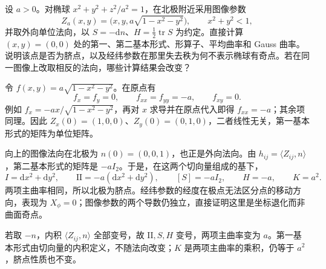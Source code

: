 \begin{exercise}\label{g1:ex:ellipsoid-polar-graph}
	设 \(a>0\)。对椭球 \(x^2+y^2+z^2/a^2=1\)，在北极附近采用图像参数
	\[
		Z_a(x,y)=\bigl(x,y,a\sqrt{1-x^2-y^2}\bigr),\qquad x^2+y^2<1,
	\]
	并取外向单位法向，以 \(S=-\mathrm{d}n\)、\(H=\tfrac12\operatorname{tr}S\) 为约定。直接计算 \((x,y)=(0,0)\) 处的第一、第二基本形式、形算子、平均曲率和 Gauss 曲率。说明该点是否为脐点，以及经纬参数在那里失去秩为何不表示椭球有奇点。若在同一图像上改取相反的法向，哪些计算结果会改变？
\end{exercise}
\begin{solution}
	令 \(f(x,y)=a\sqrt{1-x^2-y^2}\)。在原点有
	\[
		f_x=f_y=0,\qquad f_{xx}=f_{yy}=-a,\qquad f_{xy}=0.
	\]
	例如 \(f_x=-ax/\sqrt{1-x^2-y^2}\)，再对 \(x\) 求导并在原点代入即得 \(f_{xx}=-a\)；其余项同理。因此 \(Z_x(0)=(1,0,0)\)、\(Z_y(0)=(0,1,0)\)，二者线性无关，第一基本形式的矩阵为单位矩阵。

	向上的图像法向在北极为 \(n(0)=(0,0,1)\)，也正是外向法向。由 \(h_{ij}=\langle Z_{ij},n\rangle\)，第二基本形式的矩阵是 \(-aI_2\)。于是，在这两个切向量组成的基下，
	\[
		I=\mathrm dx^2+\mathrm dy^2,\qquad
		\mathrm{II}=-a(\mathrm dx^2+\mathrm dy^2),\qquad
		[S]=-aI_2,\qquad H=-a,\qquad K=a^2.
	\]
	两项主曲率相同，所以北极为脐点。经纬参数的经度在极点无法区分点的移动方向，表现为 \(X_\phi=0\)；图像参数的两个导数仍独立，直接证明这里是坐标退化而非曲面奇点。

	若取 \(-n\)，内积 \(\langle Z_{ij},n\rangle\) 全部变号，故 \(\mathrm{II},S,H\) 变号，两项主曲率变为 \(a\)。第一基本形式由切向量的内积定义，不随法向改变；\(K\) 是两项主曲率的乘积，仍等于 \(a^2\)，脐点性质也不变。
\end{solution}

